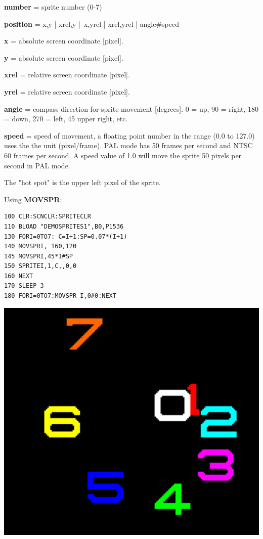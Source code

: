 \begin{description}[leftmargin=2cm,style=nextline]
                {\bf number} = sprite number (0-7)

                {\bf position} = x,y | xrel,y | x,yrel | xrel,yrel | angle\#speed

                {\bf x} = absolute screen coordinate [pixel].

                {\bf y} = absolute screen coordinate [pixel].

                {\bf xrel} = relative screen coordinate [pixel].

                {\bf yrel} = relative screen coordinate [pixel].

                {\bf angle} = compass direction for sprite movement [degrees].
                0 = up, 90 = right, 180 = down, 270 = left, 45 upper right, etc.

                {\bf speed} = speed of movement, a floating point number in the
                range (0.0 to 127.0) uses the the unit (pixel/frame).
                PAL mode has 50 frames per second and NTSC 60 frames per second.
                A speed value of 1.0 will move the sprite 50 pixels per second
                in PAL mode.


\item [Remarks:] The "hot spot" is the upper left pixel of the sprite.

\item [Example:] Using {\bf MOVSPR}:
\begin{tcolorbox}[colback=black,coltext=white]
\verbatimfont{\codefont}
\begin{verbatim}
100 CLR:SCNCLR:SPRITECLR
110 BLOAD "DEMOSPRITES1",B0,P1536
130 FORI=0TO7: C=I+1:SP=0.07*(I+1)
140 MOVSPRI, 160,120
145 MOVSPRI,45*I#SP
150 SPRITEI,1,C,,0,0
160 NEXT
170 SLEEP 3
180 FORI=0TO7:MOVSPR I,0#0:NEXT
\end{verbatim}
\end{tcolorbox}
\end{description}

\includegraphics[width=0.8\linewidth]{images/sprites.png}

